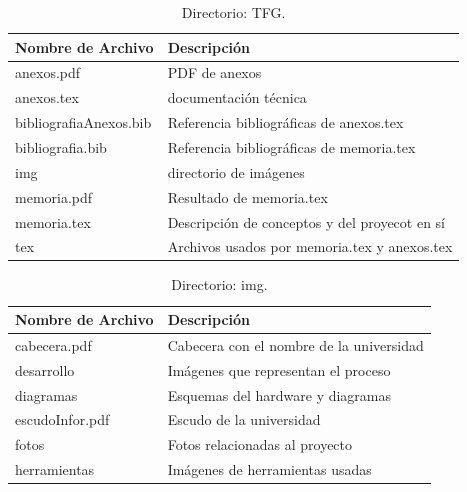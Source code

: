 \begin{table}[htbp]
\begin{center}
\caption{Directorio: TFG.}
\begin{tabular}{|l|l|} %
\hline
\rowcolor[HTML]{C0C0C0} 
\textbf{Nombre de Archivo} & \textbf{Descripción}\\ \hline
anexos.pdf & PDF de  anexos\\ \hline
anexos.tex & documentación técnica\\ \hline
bibliografiaAnexos.bib & Referencia bibliográficas de anexos.tex\\ \hline
bibliografia.bib & Referencia bibliográficas de memoria.tex\\ \hline
img & directorio de imágenes \\ \hline
memoria.pdf & Resultado de memoria.tex\\ \hline
memoria.tex & Descripción de conceptos y del proyecot en sí\\ \hline
tex & Archivos usados por memoria.tex y anexos.tex\\ \hline
\end{tabular}
\label{tabla:TFG}
\end{center}
\end{table}

\begin{table}[htbp]
\begin{center}
\caption{Directorio: img.}
\begin{tabular}{|l|l|}
\hline
\rowcolor[HTML]{C0C0C0} 
\textbf{Nombre de Archivo} & \textbf{Descripción}\\ \hline
cabecera.pdf & Cabecera con el nombre de la universidad\\ \hline
desarrollo & Imágenes que representan el proceso\\ \hline
diagramas & Esquemas del hardware y diagramas\\ \hline
escudoInfor.pdf & Escudo de la universidad\\ \hline
fotos & Fotos relacionadas al proyecto\\ \hline
herramientas & Imágenes de herramientas usadas\\ \hline
\end{tabular}
\end{center}
\end{table}

